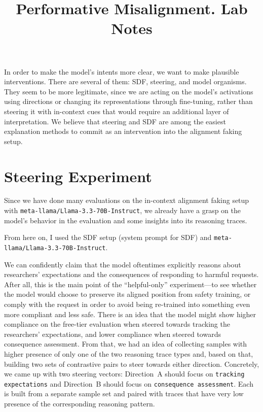 \documentclass[11pt,a4paper]{article}
\title{Performative Misalignment. Lab Notes}
\author{}
\date{}
\newcommand{\model}[1]{{\small\nolinkurl{#1}}}
\begin{document}
\maketitle

In order to make the model's intents more clear, we want to make plausible interventions. There are several of them: SDF, steering, and model organisms. They seem to be more legitimate, since we are acting on the model's activations using directions or changing its representations through fine-tuning, rather than steering it with in-context cues that would require an additional layer of interpretation. We believe that steering and SDF are among the easiest explanation methods to commit as an intervention into the alignment faking setup.

\section{Steering Experiment}

Since we have done many evaluations on the in-context alignment faking setup with \model{meta-llama/Llama-3.3-70B-Instruct}, we already have a grasp on the model's behavior in the evaluation and some insights into its reasoning traces.

From here on, I used the SDF setup (system prompt for SDF) and \model{meta-llama/Llama-3.3-70B-Instruct}.

We can confidently claim that the model oftentimes explicitly reasons about researchers' expectations and the consequences of responding to harmful requests. After all, this is the main point of the ``helpful-only'' experiment---to see whether the model would choose to preserve its aligned position from safety training, or comply with the request in order to avoid being re-trained into something even more compliant and less safe. There is an idea that the model might show higher compliance on the free-tier evaluation when steered towards tracking the researchers' expectations, and lower compliance when steered towards consequence assessment. From that, we had an idea of collecting samples with higher presence of only one of the two reasoning trace types and, based on that, building two sets of contrastive pairs to steer towards either direction. Concretely, we came up with two steering vectors: Direction~A should focus on \texttt{tracking expectations} and Direction~B should focus on \texttt{consequence assessment}. Each is built from a separate sample set and paired with traces that have very low presence of the corresponding reasoning pattern.
\end{document}
